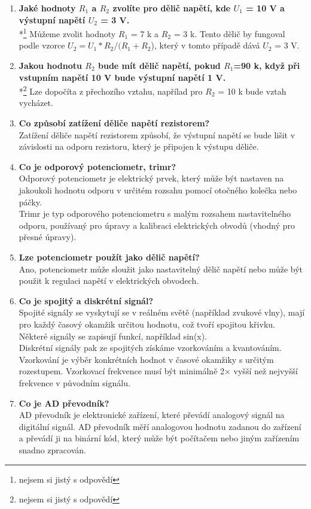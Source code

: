 \documentclass{article}
\begin{document}
\begin{enumerate}
        \item \textbf{Jaké hodnoty $R_1$ a $R_2$ zvolíte pro dělič napětí, kde $U_1$ = 10 V a výstupní napětí $U_2$ = 3 V.} \\[0.6em] {*\footnote[2]{nejsem si jistý s odpovědí} Můžeme zvolit hodnoty $R_1$ = 7 k a $R_2$ = 3 k. Tento dělič by fungoval podle vzorce $U_2 = U_1 * R_2 / (R_1 + R_2$), který v tomto případě dává $U_2$ = 3 V.}
        \item \textbf{Jakou hodnotu $R_2$ bude mít dělič napětí, pokud $R_1$=90 k, když při vstupním napětí 10 V bude výstupní napětí 1 V.} \\[0.6em] {*\footnote[3]{nejsem si jistý s odpovědí} Lze dopočíta z přechozího vztahu, napřílad pro $R_2$ = 10 k bude vztah vycházet.}
        \item \textbf{Co způsobí zatížení děliče napětí rezistorem?} \\[0.6em] { Zatížení děliče napětí rezistorem způsobí, že výstupní napětí se bude lišit v závislosti na odporu rezistoru, který je připojen k výstupu děliče.}
        \item \textbf{Co je odporový potenciometr, trimr?} \\[0.6em] { Odporový potenciometr je elektrický prvek, který může být nastaven na jakoukoli hodnotu odporu v určitém rozsahu pomocí otočného kolečka nebo páčky.} \\{Trimr je typ odporového potenciometru s malým rozsahem nastavitelného odporu, používaný pro úpravy a kalibraci elektrických obvodů (vhodný pro přesné úpravy).}
        \item \textbf{Lze potenciometr použít jako dělič napětí?} \\[0.6em] {Ano, potenciometr může sloužit jako nastavitelný dělič napětí nebo může být použit k regulaci napětí v elektrických obvodech. }
        \item \textbf{Co je spojitý a diskrétní signál?} \\[0.6em] { Spojité signály se vyskytují se v reálném světě (například zvukové vlny), mají pro každý časový okamžik určitou hodnotu, což tvoří spojitou křivku. Některé signály se zapisují funkcí, například sin(x).} \\{Diskrétní signály pak ze spojitých získáme vzorkováním a kvantováním. Vzorkování je výběr konkrétních hodnot v časové okamžiky s určitým rozestupem. Vzorkovací frekvence musí být minimálně 2× vyšší než nejvyšší frekvence v původním signálu.}
        \item \textbf{Co je AD převodník?} \\[0.6em] { AD převodník je elektronické zařízení, které převádí analogový signál na digitální signál. AD převodník měří analogovou hodnotu zadanou do zařízení a převádí ji na binární kód, který může být počítačem nebo jiným zařízením snadno zpracován.}

\end{enumerate}
\end{document}

